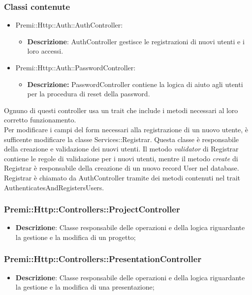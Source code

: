 	\subsubsection*{Classi contenute}
		\begin{itemize}
			\item Premi::Http::Auth::AuthController:
				\begin{itemize}
					\item \textbf{Descrizione}: AuthController gestisce le registrazioni di nuovi utenti e i loro accessi.
				\end{itemize}
			\item Premi::Http::Auth::PasswordController:
				\begin{itemize}
					\item \textbf{Descrizione:} PasswordController contiene la logica di aiuto agli utenti per la procedura di reset della password.
				\end{itemize}
		\end{itemize}
	Ognuno di questi controller usa un \gls{trait} che include i metodi necessari al loro corretto funzionamento.\\
	Per modificare i campi del form necessari alla registrazione di un nuovo utente, è sufficente modificare la classe Services::Registrar. Questa classe è responsabile della creazione e validazione dei nuovi utenti. Il metodo \textit{validator} di Registrar contiene le regole di validazione per i nuovi utenti, mentre il metodo \textit{create} di Registrar è responsabile della creazione di un nuovo record User nel database. Registrar è chiamato da AuthController tramite dei metodi contenuti nel \gls{trait} AuthenticatesAndRegistersUsers.
			
	\subsubsection*{Premi::Http::Controllers::ProjectController}
			\begin{itemize}
				\item \textbf{Descrizione}: Classe responsabile delle operazioni e della logica riguardante la gestione e la modifica di un progetto;
			\end{itemize}
			
   \subsubsection*{Premi::Http::Controllers::PresentationController}
			\begin{itemize}
				\item \textbf{Descrizione}: Classe responsabile delle operazioni e della logica riguardante la gestione e la modifica di una presentazione;
			\end{itemize}
			
